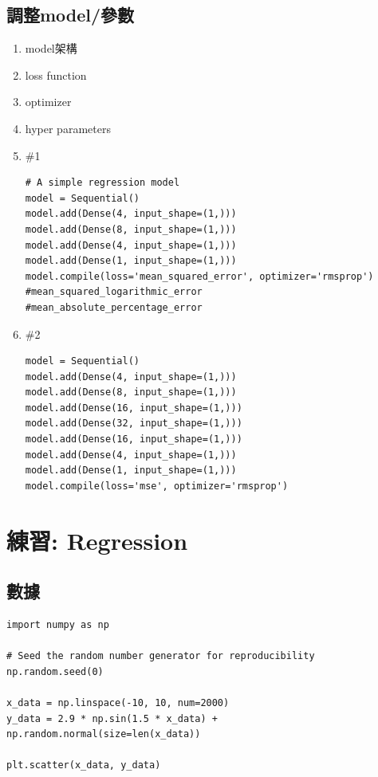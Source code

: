 \documentclass[a4paper,12pt]{article}
\begin{document}
\subsection{調整model/參數}
\label{sec:org74753e2}
\begin{enumerate}
\item model架構
\label{sec:org8ebde86}
\item loss function
\label{sec:org73d2a71}
\item optimizer
\label{sec:org38b55fc}
\item hyper parameters
\label{sec:org1a20d2b}
\item \#1
\label{sec:org7fcdcb5}
\lstset{breaklines=true,language=Python,label= ,caption= ,captionpos=b,numbers=none}
\begin{lstlisting}
# A simple regression model
model = Sequential()
model.add(Dense(4, input_shape=(1,)))
model.add(Dense(8, input_shape=(1,)))
model.add(Dense(4, input_shape=(1,)))
model.add(Dense(1, input_shape=(1,)))
model.compile(loss='mean_squared_error', optimizer='rmsprop')
#mean_squared_logarithmic_error
#mean_absolute_percentage_error

\end{lstlisting}

\item \#2
\label{sec:org7266519}
\lstset{breaklines=true,language=Python,label= ,caption= ,captionpos=b,numbers=none}
\begin{lstlisting}
model = Sequential()
model.add(Dense(4, input_shape=(1,)))
model.add(Dense(8, input_shape=(1,)))
model.add(Dense(16, input_shape=(1,)))
model.add(Dense(32, input_shape=(1,)))
model.add(Dense(16, input_shape=(1,)))
model.add(Dense(4, input_shape=(1,)))
model.add(Dense(1, input_shape=(1,)))
model.compile(loss='mse', optimizer='rmsprop') 
\end{lstlisting}
\end{enumerate}

\section{練習: Regression}
\label{sec:orgbd184da}
\subsection{數據}
\label{sec:org26a3c23}
\lstset{breaklines=true,language=Python,label= ,caption= ,captionpos=b,numbers=none}
\begin{lstlisting}
import numpy as np

# Seed the random number generator for reproducibility
np.random.seed(0)

x_data = np.linspace(-10, 10, num=2000)
y_data = 2.9 * np.sin(1.5 * x_data) + np.random.normal(size=len(x_data))

plt.scatter(x_data, y_data)
\end{lstlisting}
\end{document}
